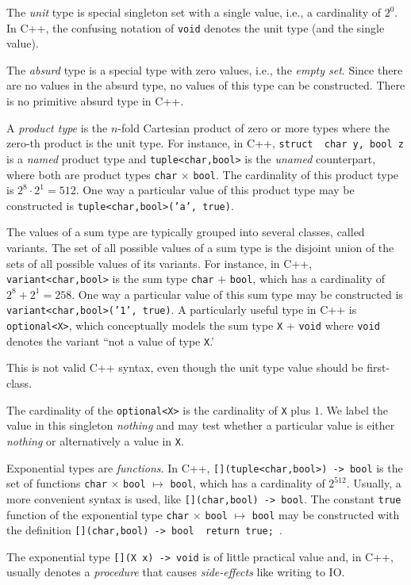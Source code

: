 \documentclass[ ../main.tex]{subfiles}
\begin{document}
The \emph{unit} type is special singleton set with a single value, i.e., a cardinality of $2^0$.
In C++, the confusing notation of \texttt{void} denotes the unit type (and the single value).
\begin{remark}
	The \emph{absurd} type is a special type with zero values, i.e., the \emph{empty set}.
	Since there are no values in the absurd type, no values of this type can be constructed.
	There is no primitive absurd type in C++.
\end{remark}

A \emph{product type} is the $n$-fold Cartesian product of zero or more types where the zero-th product is the unit type.
For instance, in C++, \texttt{struct { char y, bool z }} is a \emph{named} product type and \texttt{tuple<char,bool>}
is the \emph{unamed} counterpart, where both are product types \texttt{char} $\times$ \texttt{bool}.
The cardinality of this product type is $2^8 \cdot 2^1 = 512$.
One way a particular value of this product type may be constructed is \texttt{tuple<char,bool>('a', true)}.

The values of a sum type are typically grouped into several classes, called variants.
The set of all possible values of a sum type is the disjoint union of the sets of all possible values of its variants.
For instance, in C++, \texttt{variant<char,bool>}
is the sum type \texttt{char} $+$ \texttt{bool}, which has a cardinality of $2^8 + 2^1 = 258$.
One way a particular value of this sum type may be constructed is \texttt{variant<char,bool>('1', true)}.
A particularly useful type in C++ is \texttt{optional<X>}, which conceptually models the sum type \texttt{X} + \texttt{void} where \texttt{void} denotes the variant ``not a value of type \texttt{X}.'
\begin{remark}
	This is not valid C++ syntax, even though the unit type value should be first-class.
\end{remark}
The cardinality of the \texttt{optional<X>} is the cardinality of \texttt{X} plus $1$.
We label the value in this singleton \emph{nothing} and may test whether a particular value is either \emph{nothing} or alternatively a value in \texttt{X}.

Exponential types are \emph{functions}.
In C++, \texttt{[](tuple<char,bool>) -> bool} is the set of functions \texttt{char} $\times$ \texttt{bool} $\mapsto$ \texttt{bool}, which has a cardinality of $2^{512}$.
Usually, a more convenient syntax is used, like \texttt{[](char,bool) -> bool}.
The constant \texttt{true} function of the exponential type \texttt{char} $\times$ \texttt{bool} $\mapsto$ \texttt{bool} may be constructed with the definition \texttt{[](char,bool) -> bool { return true; }}.
\begin{remark}
	The exponential type \texttt{[](X x) -> void} is of little practical value and, in C++, usually denotes a \emph{procedure} that causes \emph{side-effects} like writing to IO.
\end{remark}
\end{document}
